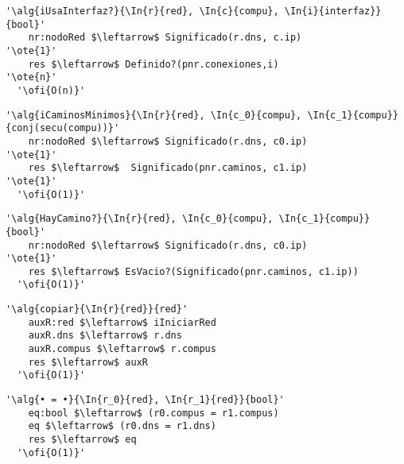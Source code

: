 \begin{lstlisting}[mathescape]
  '\alg{iUsaInterfaz?}{\In{r}{red}, \In{c}{compu}, \In{i}{interfaz}}{bool}'
    nr:nodoRed $\leftarrow$ Significado(r.dns, c.ip)                     '\ote{1}'
    res $\leftarrow$ Definido?(pnr.conexiones,i)                      '\ote{n}'
  '\ofi{O(n)}'
\end{lstlisting}

\begin{lstlisting}[mathescape]
  '\alg{iCaminosMinimos}{\In{r}{red}, \In{c_0}{compu}, \In{c_1}{compu}}{conj(secu(compu))}'
    nr:nodoRed $\leftarrow$ Significado(r.dns, c0.ip)                    '\ote{1}'
    res $\leftarrow$  Significado(pnr.caminos, c1.ip)           '\ote{1}'
  '\ofi{O(1)}'
\end{lstlisting}

\begin{lstlisting}[mathescape]
  '\alg{HayCamino?}{\In{r}{red}, \In{c_0}{compu}, \In{c_1}{compu}}{bool}'
    nr:nodoRed $\leftarrow$ Significado(r.dns, c0.ip)                    '\ote{1}'
    res $\leftarrow$ EsVacio?(Significado(pnr.caminos, c1.ip))                                       
  '\ofi{O(1)}'
\end{lstlisting}

\begin{lstlisting}[mathescape]
  '\alg{copiar}{\In{r}{red}}{red}'
    auxR:red $\leftarrow$ iIniciarRed
    auxR.dns $\leftarrow$ r.dns
    auxR.compus $\leftarrow$ r.compus
    res $\leftarrow$ auxR                                
  '\ofi{O(1)}'
\end{lstlisting}

\begin{lstlisting}[mathescape]
  '\alg{• = •}{\In{r_0}{red}, \In{r_1}{red}}{bool}'
    eq:bool $\leftarrow$ (r0.compus = r1.compus)
    eq $\leftarrow$ (r0.dns = r1.dns)
    res $\leftarrow$ eq                               
  '\ofi{O(1)}'
\end{lstlisting}


 

